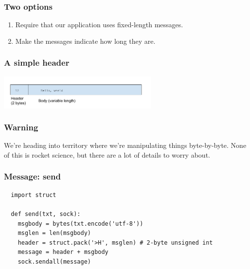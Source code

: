 \documentclass[10pt]{beamer}
\begin{document}
\begin{frame}
  \frametitle{Two options}
  
   
  \begin{enumerate}
    \item Require that our application uses fixed-length messages.
    \item Make the messages indicate how long they are.
  \end{enumerate}
  
  
    
  \end{frame}

\begin{frame}
  \frametitle{A simple header}
  
  \includegraphics[width=8cm]{message.png}
  
 
  \end{frame}

\begin{frame}
  \frametitle{Warning}
  
  We're heading into territory where we're manipulating things byte-by-byte.
  None of this is rocket science, but there are a lot of details to worry 
  about.
  
 
  \end{frame}

\begin{frame}[fragile]
  \frametitle{Message: send}
  
  \begin{verbatim}
  import struct
  
  def send(txt, sock):
    msgbody = bytes(txt.encode('utf-8'))
    msglen = len(msgbody)
    header = struct.pack('>H', msglen) # 2-byte unsigned int
    message = header + msgbody
    sock.sendall(message)
  
             
  \end{verbatim} 
   
\end{frame}
\end{document}

